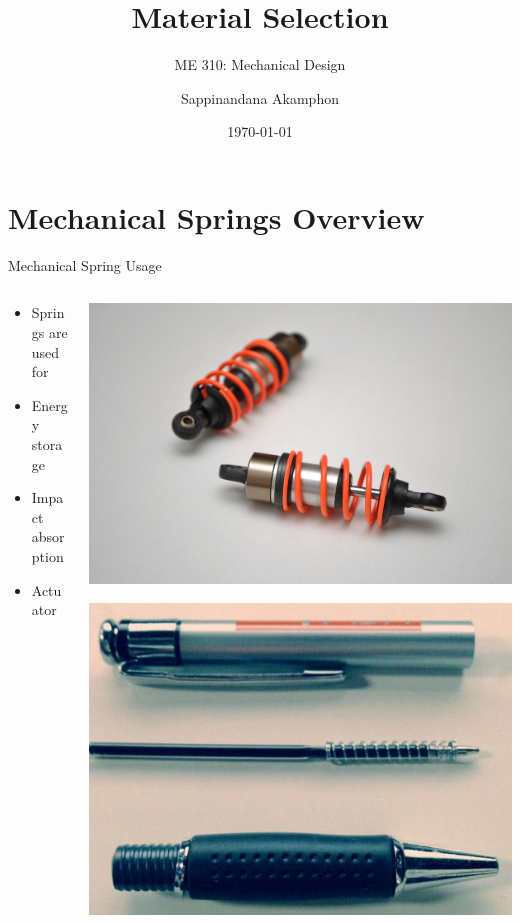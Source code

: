 \documentclass[10pt, svgnames]{beamer}
\author{Sappinandana Akamphon}
\date{\today}
\title{Material Selection}
\subtitle{ME 310: Mechanical Design}
\institute{Department of Mechanical Engineering, TSE}
\date{}
\begin{document}
\section{Mechanical Springs Overview}
\label{sec:orgdc87a8c}

\begin{frame}[label={sec:org0ae4b8c}]{Mechanical Spring Usage}
\begin{columns}
\begin{column}{0.4\columnwidth}
\begin{itemize}
\item Springs are used for
\item Energy storage
\item Impact absorption
\item Actuator
\end{itemize}
\end{column}

\begin{column}{0.6\columnwidth}
\begin{center}
\includegraphics[width=.9\linewidth]{./pictures/shock-absorbers.JPG}
\end{center}
\begin{center}
\includegraphics[width=.9\linewidth]{./pictures/pen-spring.jpg}
\end{center}
\end{column}
\end{columns}
\end{frame}
\end{document}
